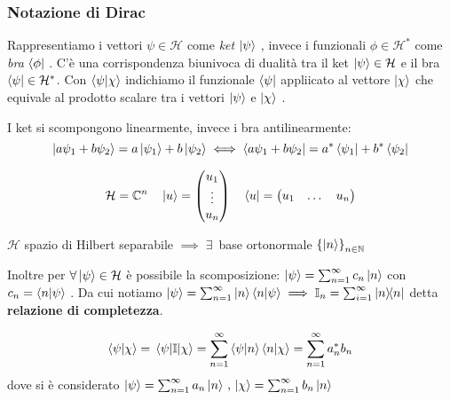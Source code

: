 \subsubsection{Notazione di Dirac}
Rappresentiamo i vettori \(\psi \in \mathcal{H}\) come \textit{ket} \(\ket{\psi}\) , 
invece i funzionali \(\phi\in \mathcal{H}^*\) come \textit{bra} \(\bra{\phi}\) .
C'è una corrispondenza biunivoca di dualità tra il ket \(\ket{\psi}\in \mathcal{H}\) e il bra \(\bra{\psi} \in \mathcal{H}^*\).
Con \(\braket{\psi}{\chi}\) indichiamo il funzionale \(\bra{\psi}\) appliicato al vettore \(\ket{\chi}\)
che equivale al prodotto scalare tra i vettori \(\ket{\psi}\) e \(\ket{\chi}\) .
\begin{attention}
    I ket si scompongono linearmente, invece i bra antilinearmente:
    \[
    \ket{a\psi_1+b\psi_2}= a\ket{\psi_1}+ b\ket{\psi_2} \iff \bra{a\psi_1+b\psi_2}= a^*\bra{\psi_1}+ b^* \bra{\psi_2}
    \]
\end{attention}

\begin{example}
    \[
    \mathcal{H}= \mathbb{C}^n   \quad \ket{u}= \begin{pmatrix}
        u_1\\\vdots \\ u_n  
    \end{pmatrix}
    \quad \bra{u}= \begin{pmatrix}
        u_1 & \dots & u_n
    \end{pmatrix}
    \]
\end{example}



\begin{theorem}
    \(\mathcal{H} \) spazio di Hilbert separabile \(\implies  \;\exists\,\) base ortonormale
    \(\left\{ \ket{n} \right\}_{n \in \mathbb{N}}\)
\end{theorem}
Inoltre per \(\forall \ket{\psi} \in \mathcal{H}\) è possibile la scomposizione:
\(\ket{\psi}= \sum_{n=1}^{\infty}c_n\ket{n}\) con \(c_n = \braket{n}{\psi}\) .
Da cui notiamo \(\ket{\psi}= \sum_{n=1}^{\infty}\ket{n}\braket{n}{\psi} \implies \mathbb{I}_n= \sum_{i=1}^{\infty} \dyad{n}{n}\)
detta \textbf{relazione di completezza}.

\begin{example}
    \[
    \braket{\psi}{\chi}= \matrixel{\psi}{\mathbb{I}}{\chi}=
    \sum_{n=1}^{\infty} \braket{\psi}{n}\braket{n}{\chi}  = \sum_{n=1}^{\infty} a^*_n b_n
    \]
    dove si è considerato \(\ket{\psi}= \sum_{n=1}^{\infty}a_n \ket{n} \,, 
    \, \ket{\chi}= \sum_{n=1}^{\infty}b_n \ket{n}\)
\end{example}

